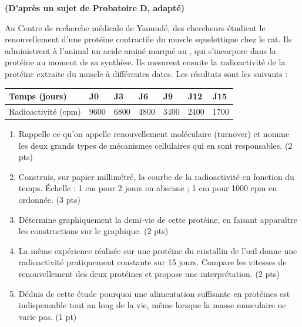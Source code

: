 \documentclass[11pt]{article}
\newcounter{popsec}
\newcounter{popsub}
\newcommand{\courssub}[1]{%
  \stepcounter{popsub}%
  \par\vspace{9pt}\noindent{\popxbold\fontsize{11.5}{13}\selectfont\color{popink}{\color{poporange}\thepopsec.\thepopsub}\hspace{6pt}#1}\par\nopagebreak\vspace{4pt}
}
\begin{document}
\courssub{Je me prépare au Probatoire}

\begin{exercice}
\textbf{(D'après un sujet de Probatoire D, adapté)}

Au Centre de recherche médicale de Yaoundé, des chercheurs étudient le renouvellement d'une protéine contractile du muscle squelettique chez le rat. Ils administrent à l'animal un acide aminé marqué au , qui s'incorpore dans la protéine au moment de sa synthèse. Ils mesurent ensuite la radioactivité de la protéine extraite du muscle à différentes dates. Les résultats sont les suivants :

\begin{center}
\begin{tabularx}{\linewidth}{|l|X|X|X|X|X|X|}
\hline
\rowcolor{popblueL} Temps (jours) & J0 & J3 & J6 & J9 & J12 & J15 \\
\hline
Radioactivité (cpm) & 9600 & 6800 & 4800 & 3400 & 2400 & 1700 \\
\hline
\end{tabularx}
\end{center}

\begin{enumerate}
\item Rappelle ce qu'on appelle renouvellement moléculaire (turnover) et nomme les deux grands types de mécanismes cellulaires qui en sont responsables. \hfill (2 pts)
\item Construis, sur papier millimétré, la courbe de la radioactivité en fonction du temps. Échelle : 1 cm pour 2 jours en abscisse ; 1 cm pour 1000 cpm en ordonnée. \hfill (3 pts)
\item Détermine graphiquement la demi-vie de cette protéine, en faisant apparaître les constructions sur le graphique. \hfill (2 pts)
\item La même expérience réalisée sur une protéine du cristallin de l'œil donne une radioactivité pratiquement constante sur 15 jours. Compare les vitesses de renouvellement des deux protéines et propose une interprétation. \hfill (2 pts)
\item Déduis de cette étude pourquoi une alimentation suffisante en protéines est indispensable tout au long de la vie, même lorsque la masse musculaire ne varie pas. \hfill (1 pt)
\end{enumerate}
\end{exercice}
\end{document}
